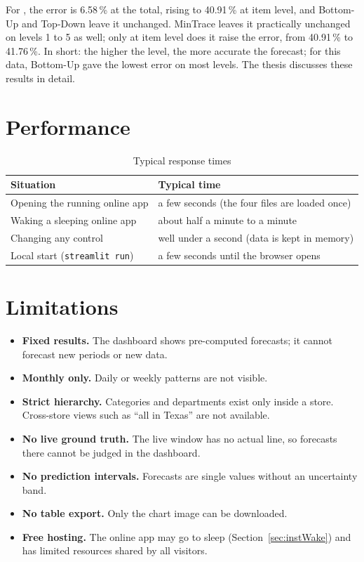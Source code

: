 For , the error is 6.58\,\% at the total, rising to 40.91\,\% at item level, and Bottom-Up and Top-Down leave it unchanged. MinTrace leaves it practically unchanged on levels 1 to 5 as well; only at item level does it raise the error, from 40.91\,\% to 41.76\,\%. In short: the higher the level, the more accurate the forecast; for this data, Bottom-Up gave the lowest error on most levels. The thesis discusses these results in detail.

\section{Performance}
\label{sec:specPerformance}

\begin{table}[H]
\centering
\caption{Typical response times}
\label{tab:specPerformance}
\small
\begin{tabularx}{\linewidth}{@{}lX@{}}
\toprule
\textbf{Situation} & \textbf{Typical time} \\
\midrule
Opening the running online app & a few seconds (the four files are loaded once) \\
Waking a sleeping online app & about half a minute to a minute \\
Changing any control & well under a second (data is kept in memory) \\
Local start (\texttt{streamlit run}) & a few seconds until the browser opens \\
\bottomrule
\end{tabularx}
\end{table}

\section{Limitations}
\label{sec:specLimits}

\begin{itemize}
  \item \textbf{Fixed results.} The dashboard shows pre-computed forecasts; it cannot forecast new periods or new data.
  \item \textbf{Monthly only.} Daily or weekly patterns are not visible.
  \item \textbf{Strict hierarchy.} Categories and departments exist only inside a store. Cross-store views such as ``all  in Texas'' are not available.
  \item \textbf{No live ground truth.} The live window has no actual line, so forecasts there cannot be judged in the dashboard.
  \item \textbf{No prediction intervals.} Forecasts are single values without an uncertainty band.
  \item \textbf{No table export.} Only the chart image can be downloaded.
  \item \textbf{Free hosting.} The online app may go to sleep (Section~\ref{sec:instWake}) and has limited resources shared by all visitors.
\end{itemize}
